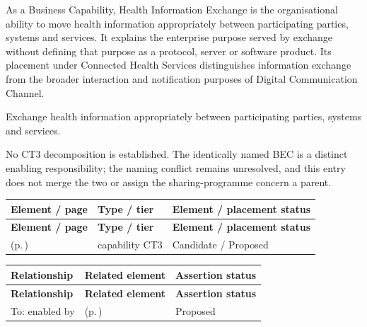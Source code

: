 As a Business Capability, Health Information Exchange is the organisational ability to move health information appropriately between participating parties, systems and services. It explains the enterprise purpose served by exchange without defining that purpose as a protocol, server or software product. Its placement under Connected Health Services distinguishes information exchange from the broader interaction and notification purposes of Digital Communication Channel.



Exchange health information appropriately between participating parties, systems and services.



No CT3 decomposition is established. The identically named BEC is a distinct enabling responsibility; the naming conflict remains unresolved, and this entry does not merge the two or assign the sharing-programme concern a parent.


\begingroup\small\setlength{\TableWidth}{\dimexpr\linewidth-6\tabcolsep-4\arrayrulewidth\relax}
\begin{longtable}{|>{\raggedright\arraybackslash}p{0.52\TableWidth}|>{\raggedright\arraybackslash}p{0.2\TableWidth}|>{\raggedright\arraybackslash}p{0.28\TableWidth}|}
\hline\rowcolor{TableHead}\textbf{Element / page} & \textbf{Type / tier} & \textbf{Element / placement status}\\\hline\endfirsthead
\hline\rowcolor{TableHead}\textbf{Element / page} & \textbf{Type / tier} & \textbf{Element / placement status}\\\hline\endhead
\hline\endfoot
\nameref{cap:bc-health-information-sharing-programme-management} (p.\,\pageref{cap:bc-health-information-sharing-programme-management}) & capability CT3 & Candidate / Proposed\\\hline
\end{longtable}\endgroup

\begingroup\small\setlength{\TableWidth}{\dimexpr\linewidth-6\tabcolsep-4\arrayrulewidth\relax}
\begin{longtable}{|>{\raggedright\arraybackslash}p{0.27\TableWidth}|>{\raggedright\arraybackslash}p{0.48\TableWidth}|>{\raggedright\arraybackslash}p{0.25\TableWidth}|}
\hline\rowcolor{TableHead}\textbf{Relationship} & \textbf{Related element} & \textbf{Assertion status}\\\hline\endfirsthead
\hline\rowcolor{TableHead}\textbf{Relationship} & \textbf{Related element} & \textbf{Assertion status}\\\hline\endhead
\hline\endfoot
To: enabled by & \nameref{cap:bec-health-information-exchange} (p.\,\pageref{cap:bec-health-information-exchange}) & Proposed\\\hline
\end{longtable}\endgroup


